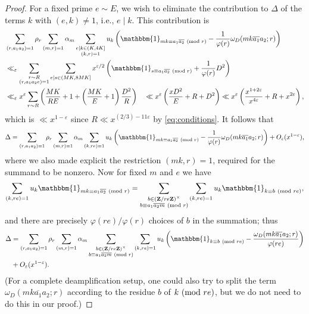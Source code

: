 \documentclass[reqno,11pt]{amsart}
\theoremstyle{definition}
\theoremstyle{remark}
\numberwithin{equation}{section}
\newcommand{\Z}{\mathbf{Z}}
\newcommand{\one}{\mathbbm{1}}
\newcommand{\eps}{\varepsilon}
\renewcommand{\bar}{\overline}
\renewcommand{\pmod}[1]{\ (\textnormal{mod } #1)}
\begin{document}
\begin{proof}
For a fixed prime $e \sim E$, we wish to eliminate the contribution to $\Delta$ of the terms $k$ with $(e, k) \neq 1$, i.e., $e \mid k$. This contribution is
\[
\begin{aligned}
    &\sum_{(r,a_1a_2)=1} \rho_r \sum_{(m, r) = 1} \alpha_m \sum_{\substack{e \mid k \in (K, 4K] \\ (k, r) = 1}} u_{k} \left(\one_{mk \equiv a_1 \bar{a_2} \pmod{r}} - \frac{1}{\varphi(r)} \omega_D(mk \bar{a_1}a_2; r) \right)
    \\
    &\ll_\eps 
    \sum_{\substack{r \sim R \\ (r,a_1a_2e)=1}} \sum_{e \mid s \in (MK, 8MK]} x^{\eps/2} \left(\one_{s \equiv a_1 \bar{a_2} \pmod{r}} + \frac{1}{\varphi(r)} D^2 \right)
    \\
    &\ll_\eps
    x^{\eps} \sum_{r \sim R} \left(\frac{MK}{RE} + 1 + \left(\frac{MK}{E} + 1\right) \frac{D^2}{R}\right)
    \quad 
    \ll
    x^{\eps} \left(\frac{xD^2}{E} + R + D^2\right)
    \ll 
    x^{\eps} \left(\frac{x^{1+2\eps}}{x^{4\eps}} + R + x^{2\eps}\right),
\end{aligned}
\]
which is $\ll x^{1-\eps}$ since $R \ll x^{(2/3)-11\eps}$ by \cref{eq:conditions}. It follows that 
\[
    \Delta = \sum_{(r,a_1a_2)=1} \rho_r \sum_{(m,r)=1} \alpha_m \sum_{(k,re)=1} u_k \left(\one_{mk \equiv a_1 \bar{a_2} \pmod{r}} - \frac{1}{\varphi(r)} \omega_D(mk \bar{a_1}a_2; r) \right) + O_\eps(x^{1-\eps}),
\]
where we also made explicit the restriction $(mk, r) = 1$, required for the summand to be nonzero. Now for fixed $m$ and $e$ we have
\[
    \sum_{(k,re)=1} u_k \one_{mk \equiv a_1 \bar{a_2} \pmod{r}}
    =
    \sum_{\substack{b \in (\Z/re\Z)^\times \\ b \equiv a_1\bar{a_2 m} \pmod{r}}}
    \sum_{(k,re)=1} u_k \one_{k \equiv b \pmod{re}},
\]
and there are precisely $\varphi(re)/\varphi(r)$ choices of $b$ in the summation; thus
\[
\begin{aligned}
    \Delta &= \sum_{(r,a_1a_2)=1} \rho_r \sum_{(m,r)=1} \alpha_m \sum_{\substack{b \in (\Z/re\Z)^\times \\ b \equiv a_1\bar{a_2 m} \pmod{r}}} \sum_{(k,re)=1} u_k \left(\one_{k \equiv b \pmod{re}} - \frac{\omega_D(mk \bar{a_1}a_2; r)}{\varphi(re)} \right) 
    \\
    &+ O_\eps(x^{1-\eps}).
\end{aligned}
\]
(For a complete deamplification setup, one could also try to split the term $\omega_D(mk\bar{a_1}a_2; r)$ according to the residue $b$ of $k \pmod{re}$, but we do not need to do this in our proof.)


\end{proof}
\end{document}
